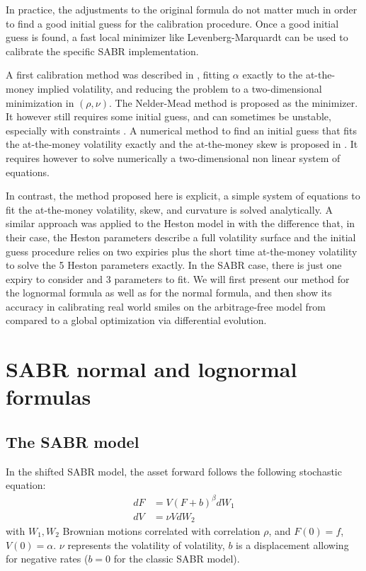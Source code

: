 \documentclass[]{rAMF2e}
\begin{document}
In practice, the adjustments to the original formula do not matter much in order to find a good initial guess for the calibration procedure. Once a good initial guess is found, a fast local minimizer like Levenberg-Marquardt can be used to calibrate the specific SABR implementation. 

A first calibration method was described in \citep{west2005calibration}, fitting $\alpha$ exactly to the at-the-money implied volatility, and reducing the problem to a two-dimensional minimization in $(\rho,\nu)$. The Nelder-Mead method is proposed as the minimizer. It however still requires some initial guess, and can sometimes be unstable, especially with constraints \citep{lefloch2014nelder}. A numerical method to find an initial guess that fits the at-the-money volatility exactly and the at-the-money skew is proposed in \citep{gauthier2009fitting}. It requires however to solve numerically a two-dimensional non linear system of equations.

In contrast, the method proposed here is explicit, a simple system of equations to fit the at-the-money volatility, skew, and curvature is solved analytically. A similar approach was applied to the Heston model in \citep{forde2012small} with the difference that, in their case, the Heston parameters describe a full volatility surface and the initial guess procedure relies on two expiries plus the short time at-the-money volatility to solve the 5 Heston parameters exactly. In the SABR case, there is just one expiry to consider and 3 parameters to fit. We will first present our method for the lognormal formula as well as for the normal formula, and then show its accuracy in calibrating real world smiles on the arbitrage-free model from \citet{hagan2013arbitrage} compared to a global optimization via differential evolution.


\section{SABR normal and lognormal formulas}

\subsection{The SABR model}
In the shifted SABR model, the asset forward follows the following stochastic equation:
\begin{align}
dF &= V (F+b)^\beta dW_1\\
dV &= \nu V dW_2
\end{align}
with $W_1, W_2$ Brownian motions correlated with correlation $\rho$,
and $F(0) = f$, $V(0) = \alpha$.
$\nu$ represents the volatility of volatility, $b$ is a displacement allowing for negative rates ($b=0$ for the classic SABR model).
\end{document}
